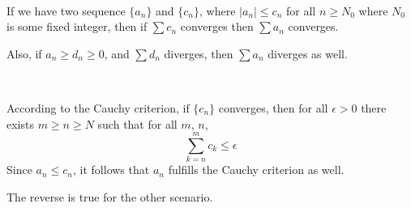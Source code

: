 \documentclass{article}
\begin{document}
\begin{theorem}
\

If we have two sequence $\{a_n\}$ and $\{c_n\}$, where $\vert a_n \vert \leq c_n$ for all $n \geq N_0$ where $N_0$ is some fixed integer, then if $\sum c_n$ converges then $\sum a_n$ converges.

Also, if $a_n \geq d_n \geq 0$, and $\sum d_n$ diverges, then $\sum a_n$ diverges as well.
\end{theorem}

\begin{customproof}
\

According to the Cauchy criterion, if $\{c_n\}$ converges, then for all $\epsilon > 0$ there exists $m \geq n \geq N$ such that for all $m$, $n$, $$\sum_{k=n}^m c_k \leq \epsilon$$Since $a_n \leq c_n$, it follows that $a_n$ fulfills the Cauchy criterion as well.

The reverse is true for the other scenario.
\end{customproof}
\end{document}
